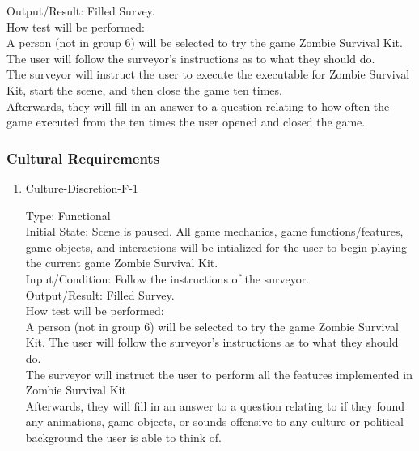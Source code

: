 \documentclass[12pt, titlepage]{article}
\newcounter{ftnum}
\newcounter{nftnum}
\begin{document}
\begin{enumerate}
	Output/Result: Filled Survey.\\
	
	How test will be performed:\\ A person (not in group 6) will be selected to try the game Zombie Survival Kit. The user will follow the surveyor's instructions as to what they should do. \\
	The surveyor will instruct the user to execute the executable for Zombie Survival Kit, start the scene, and then close the game ten times.\\
	Afterwards, they will fill in an answer to a question relating to how often the game executed from the ten times the user opened and closed the game. \\
	
\end{enumerate}

\subsubsection{Cultural Requirements}

\begin{enumerate}
	
	\item{Culture-Discretion-F-1\\}  \label{NF16}
	
	Type: Functional\\
	
	Initial State: Scene is paused. All game mechanics, game functions/features, game objects, and interactions will be intialized for the user to begin playing the current game Zombie Survival Kit.\\
	
	Input/Condition: Follow the instructions of the surveyor.\\
	
	Output/Result: Filled Survey.\\
	
	How test will be performed:\\ A person (not in group 6) will be selected to try the game Zombie Survival Kit. The user will follow the surveyor's instructions as to what they should do. \\
	The surveyor will instruct the user to perform all the features implemented in Zombie Survival Kit\\
	Afterwards, they will fill in an answer to a question relating to if they found any animations, game objects, or sounds offensive to any culture or political background the user is able to think of.\\
	
\end{enumerate}
\end{document}
